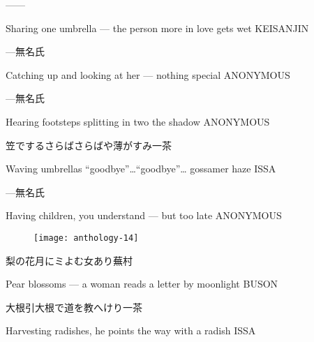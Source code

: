 \begin{haiku}
    ---\hfill{---}

    \vin{} Sharing one umbrella ---
    \vin{} \vin{} the person more in love
    \vin{} \vin{} \vin{} gets wet \hspace{\fill} KEISANJIN
\end{haiku}

\begin{haiku}
    {---}\hfill{\FH 無名氏}

    \vin{} Catching up
    \vin{} \vin{} and looking at her ---
    \vin{} \vin{} \vin{} nothing special \hspace{\fill} ANONYMOUS
\end{haiku}

\begin{haiku}
    {---}\hfill{\FH 無名氏}

    \vin{} Hearing footsteps
    \vin{} \vin{} splitting in two
    \vin{} \vin{} \vin{} the shadow \hspace{\fill} ANONYMOUS
\end{haiku}

\begin{haiku}
    {\FH 笠でするさらばさらばや薄がすみ}\hfill{\FH 一茶}

    \vin{} Waving umbrellas
    \vin{} \vin{} ``goodbye''\ldots``goodbye''\ldots
    \vin{} \vin{} \vin{} gossamer haze \hspace{\fill} ISSA
\end{haiku}

\begin{haiku}
    {---}\hfill{\FH 無名氏}

    \vin{} Having children,
    \vin{} \vin{} you understand ---
    \vin{} \vin{} \vin{} but too late \hspace{\fill} ANONYMOUS
\end{haiku}

\begin{figure}
    \texttt{[image: anthology-14]}
\end{figure}

\begin{haiku}
    {\FH 梨の花月にミよむ女あり}\hfill{\FH 蕪村}

    \vin{} Pear blossoms ---
    \vin{} \vin{} a woman reads a letter
    \vin{} \vin{} \vin{} by moonlight \hspace{\fill} BUSON
\end{haiku}

\begin{haiku}
    {\FH 大根引大根で道を教へけり}\hfill{\FH 一茶}

    \vin{} Harvesting radishes,
    \vin{} \vin{} he points the way
    \vin{} \vin{} \vin{} with a radish \hspace{\fill} ISSA
\end{haiku}

